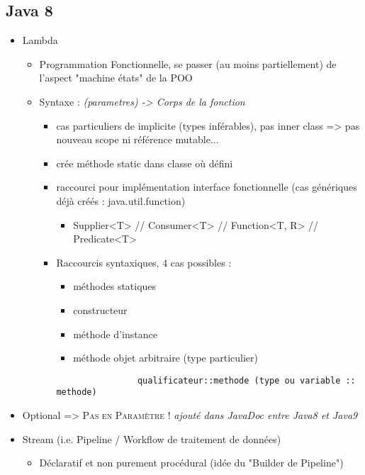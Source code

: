 \documentclass[11pt,twoside,a4paper]{article}
\begin{document}
\begin{landscape}
\begin{multicols}{2}
	\section*{Java 8}
	\begin{itemize}
		\item Lambda
		\begin{itemize}
			\item[] Programmation Fonctionnelle, se passer (au moins partiellement) de l'aspect "machine  {\'e}tats" de la POO
			\item[] Syntaxe : \emph{(parametres) -> {Corps de la fonction }}
			\begin{itemize}
				\item[] cas particuliers de implicite (types inf{\'e}rables), pas inner class => pas nouveau scope ni r{\'e}f{\'e}rence mutable...
				\item[] cr{\'e}e m{\'e}thode static dans classe o{\`u} d{\'e}fini
				\item[] raccourci pour impl{\'e}mentation interface fonctionnelle (cas g{\'e}n{\'e}riques d{\'e}j{\`a} cr{\'e}{\'e}s : java.util.function)
				\begin{itemize}
					\footnotesize
					\item[] Supplier<T> // Consumer<T> // Function<T, R> // Predicate<T>
				\end{itemize}
				\item[] Raccourcis syntaxiques, 4 cas possibles : 
				\begin{itemize}
					\item[] m{\'e}thodes statiques
					\item[] constructeur
					\item[] m{\'e}thode d'instance
					\item[] m{\'e}thode objet arbitraire (type particulier)
				\end{itemize}
				\begin{verbatim}
				qualificateur::methode (type ou variable :: methode)
				\end{verbatim}
			\end{itemize}
		\end{itemize}
		\item Optional => \textsc{Pas en Param{\`e}tre} ! \emph{\footnotesize ajout{\'e} dans JavaDoc entre Java8 et Java9}
		\item Stream ({\footnotesize i.e. Pipeline / Workflow de traitement de donn{\'e}es})
		\begin{itemize}
			\item[] D{\'e}claratif et non purement proc{\'e}dural (id{\'e}e du "Builder de Pipeline")

\end{itemize}
\end{itemize}
\end{multicols}
\end{landscape}
\end{document}
